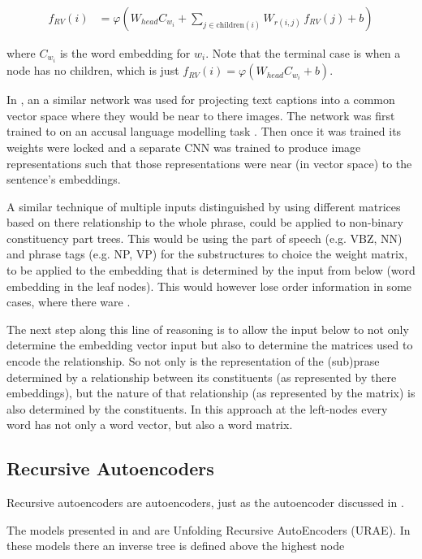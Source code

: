 \documentclass[12pt,parskip]{komatufte}
\begin{document}
\begin{align}
	f_{RV}(i) &= \varphi\left(W_{head} C_{w_i} + \sum_{j \in \mathrm{children}(i)} W_{r(i,j)} \, f_{RV}(j) + b \right)
\end{align}

where $C_{w_i}$ is the word embedding for $w_i$.
Note that the terminal case is when a node has no children, which is just $f_{RV}(i) = \varphi \left( W_{head} C_{w_i} + b \right)$.

In \textcite{socherDTRNN}, an a similar network was used for projecting text captions into a common vector space where they would be near to there images.
The network was first trained to on an accusal language modelling task .
Then once it was trained its weights were locked and a separate CNN was trained to produce image representations such that those representations were near (in vector space) to the sentence's embeddings.


A similar technique of multiple inputs distinguished by using different matrices based on there relationship to the whole phrase,
 could be applied to non-binary constituency part trees.
This would be using the part of speech (e.g. VBZ, NN) and phrase tags (e.g. NP, VP) for the substructures to choice the weight matrix, to be applied to the embedding that is determined by the input from below (word embedding in the leaf nodes).
This would however lose order information in some cases, where there ware .

The next step along this line of reasoning is to allow the input below to not only determine the embedding vector input but also to determine the matrices used to encode the relationship.
So not only is the representation of the (sub)prase determined by a relationship between  its constituents (as represented by there embeddings),
but the nature of that relationship (as represented by the matrix) is also determined by the constituents.
In this approach at the left-nodes every word has not only a word vector, but also a word matrix.




\subsection{Recursive Autoencoders}
Recursive autoencoders are autoencoders, just as the autoencoder discussed in .


The models presented in \textcite{SocherEtAl2011:PoolRAE} and \textcite{iyyer2014generating}
are Unfolding Recursive AutoEncoders (URAE).
In these models there an inverse tree is defined above the highest node
\end{document}
